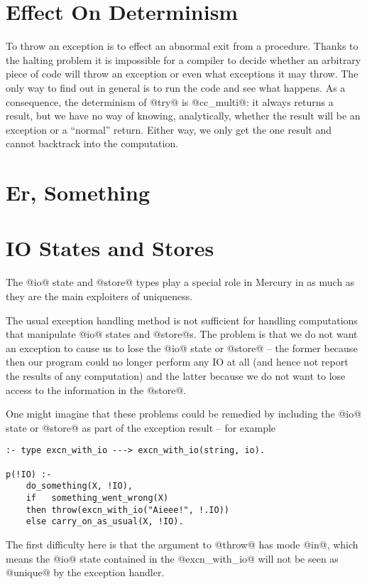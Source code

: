 \section{Effect On Determinism}

To throw an exception is to effect an abnormal exit from a procedure.
Thanks to the halting problem \XXX{} it is impossible for a compiler to
decide whether an arbitrary piece of code will throw an exception or
even what exceptions it may throw.  The only way to find out in general
is to run the code and see what happens.  As a consequence, the
determinism of @try@ is @cc_multi@: it always returns a result, but we
have no way of knowing, analytically, whether the result will be an
exception or a ``normal'' return.  Either way, we only get the one
result and cannot backtrack into the computation.

\section{Er, Something}


\section{IO States and Stores}

The @io@ state and @store@ types play a special role in Mercury in as
much as they are the main exploiters of uniqueness.  

The usual exception handling method is not sufficient for handling
computations that manipulate @io@ states and @store@s.  The problem is
that we do not want an exception to cause us to lose the @io@ state or
@store@ -- the former because then our program could no longer perform
any IO at all (and hence not report the results of any computation) and
the latter because we do not want to lose access to the information
in the @store@.

One might imagine that these problems could be remedied by including the
@io@ state or @store@ as part of the exception result -- for example
\begin{verbatim}
:- type excn_with_io ---> excn_with_io(string, io).

p(!IO) :-
    do_something(X, !IO),
    if   something_went_wrong(X)
    then throw(excn_with_io("Aieee!", !.IO))
    else carry_on_as_usual(X, !IO).
\end{verbatim}
The first difficulty here is that the argument to @throw@ has mode @in@,
which means the @io@ state contained in the @excn_with_io@ will not be
seen as @unique@ by the exception handler.

